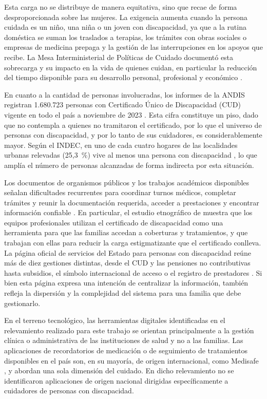 Esta carga no se distribuye de manera equitativa, sino que recae de forma desproporcionada sobre las mujeres. La exigencia aumenta cuando la persona cuidada es un niño, una niña o un joven con discapacidad, ya que a la rutina doméstica se suman los traslados a terapias, los trámites con obras sociales o empresas de medicina prepaga y la gestión de las interrupciones en los apoyos que recibe. La Mesa Interministerial de Políticas de Cuidado documentó esta sobrecarga y su impacto en la vida de quienes cuidan, en particular la reducción del tiempo disponible para su desarrollo personal, profesional y económico \citep{mesacuidados2020}.

En cuanto a la cantidad de personas involucradas, los informes de la ANDIS registran 1.680.723 personas con Certificado Único de Discapacidad (CUD) vigente en todo el país a noviembre de 2023 \citep{andis2023}. Esta cifra constituye un piso, dado que no contempla a quienes no tramitaron el certificado, por lo que el universo de personas con discapacidad, y por lo tanto de sus cuidadores, es considerablemente mayor. Según el INDEC, en uno de cada cuatro hogares de las localidades urbanas relevadas (25,3~\%) vive al menos una persona con discapacidad \citep{indec2018}, lo que amplía el número de personas alcanzadas de forma indirecta por esta situación.

Los documentos de organismos públicos y los trabajos académicos disponibles señalan dificultades recurrentes para coordinar turnos médicos, completar trámites y reunir la documentación requerida, acceder a prestaciones y encontrar información confiable \citep{mesacuidados2020,levin2024}. En particular, el estudio etnográfico de \citet{levin2024} muestra que los equipos profesionales utilizan el certificado de discapacidad como una herramienta para que las familias accedan a coberturas y tratamientos, y que trabajan con ellas para reducir la carga estigmatizante que el certificado conlleva. La página oficial de servicios del Estado para personas con discapacidad reúne más de diez gestiones distintas, desde el CUD y las pensiones no contributivas hasta subsidios, el símbolo internacional de acceso o el registro de prestadores \citep{senadis}. Si bien esta página expresa una intención de centralizar la información, también refleja la dispersión y la complejidad del sistema para una familia que debe gestionarlo.

En el terreno tecnológico, las herramientas digitales identificadas en el relevamiento realizado para este trabajo se orientan principalmente a la gestión clínica o administrativa de las instituciones de salud y no a las familias. Las aplicaciones de recordatorios de medicación o de seguimiento de tratamientos disponibles en el país son, en su mayoría, de origen internacional, como Medisafe \citep{medisafe2026}, y abordan una sola dimensión del cuidado. En dicho relevamiento no se identificaron aplicaciones de origen nacional dirigidas específicamente a cuidadores de personas con discapacidad.

